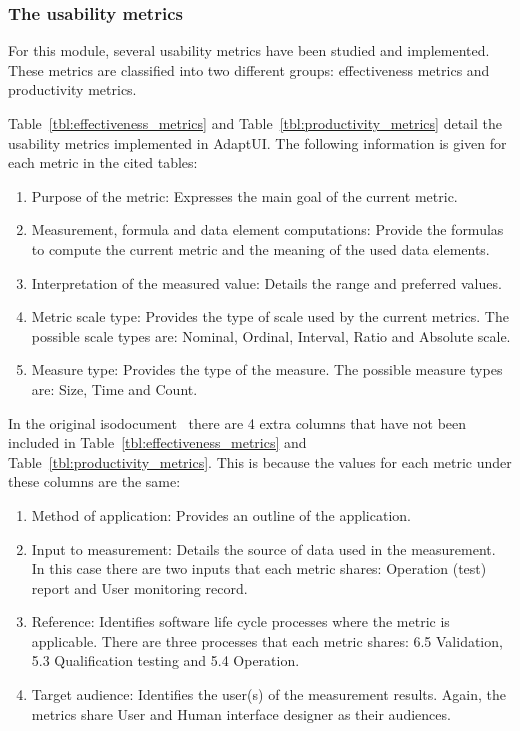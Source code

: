

\subsubsection{The usability metrics}
\label{sec:usability_metrics}
For this module, several usability metrics have been studied and implemented.
These metrics are classified into two different groups: effectiveness metrics
and productivity metrics.

Table~\ref{tbl:effectiveness_metrics} and Table~\ref{tbl:productivity_metrics}
detail the usability metrics implemented in AdaptUI. The following information
is given for each metric in the cited tables:

\begin{enumerate}[label=\alph*)]
  \item Purpose of the metric: Expresses the main goal of the current metric.
  \item Measurement, formula and data element computations: Provide the formulas
  to compute the current metric and the meaning of the used data elements.
  \item Interpretation of the measured value: Details the range and preferred values.
  \item Metric scale type: Provides the type of scale used by the current metrics.
  The possible scale types are: Nominal, Ordinal, Interval, Ratio and Absolute
  scale.
  \item Measure type: Provides the type of the measure. The possible measure
  types are: Size, Time and Count.
\end{enumerate}

In the original \ac{iso}document~\citep{ISOIEC9126} there are 4 extra columns that
have not been included in Table~\ref{tbl:effectiveness_metrics} and
Table~\ref{tbl:productivity_metrics}. This is because the values for each metric
under these columns are the same:

\begin{enumerate}[label=\alph*)]
  \item Method of application: Provides an outline of the application. 
  
  \item Input to measurement: Details the source of data used in the measurement.
  In this case there are two inputs that each metric shares: Operation (test) 
  report and User monitoring record.
  
  \item Reference: Identifies software life cycle processes where the metric is
  applicable. There are three processes that each metric shares: 6.5 Validation,
  5.3 Qualification testing and 5.4 Operation.
  
  \item Target audience: Identifies the user(s) of the measurement results. Again,
  the metrics share User and Human interface designer as their audiences.
\end{enumerate}


